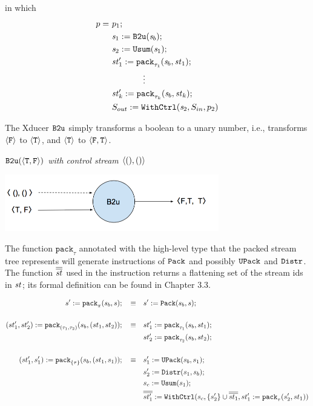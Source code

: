 in which $$ \begin{aligned}
p = & \ p_1; \\
& \ \sdef{\s_1}{\bu(\s_b)}; \\
& \ \sdef{\s_2}{\usum(\s_1)}; \\
& \ \sdef{\st_1'}{\Pack{\s_b}{\st_1}{\tau_1}}; \\
& \qquad \qquad \vdots \\
& \ \sdef{\st_k'}{\Pack{\s_b}{\st_k}{\tau_k}}; \\
& \ \withctrl{\s_2}{p_2}{\Sin}{\Sout} \\
\end{aligned}$$
	
The Xducer $\bu$ simply transforms a boolean to a unary number, i.e.,  transforms $\oF$ to $\oT$, and $\oT$ to $\< \F, \T \'>$.
\begin{example} \emph{$\bu({\<\T,\F\'>})$ with control stream $\< (),() \'>$}\\
\begin{center}
	\includegraphics[width=0.7\textwidth]{b2uxudcer2}
\end{center}
\end{example}

The function $\mathtt{pack}_{\tau}$ annotated with the high-level type  that the packed stream tree represents will generate instructions of $\pack$ and possibly $\upack$ and $\distr$. The function $\olol{st}$  used in the instruction \wc returns a flattening set of the stream ids in $\st$; its formal definition can be found in Chapter 3.3.

\begin{align*}
s' := \Pack{s_b}{s}{\pi}; \quad \equiv & \quad s' := \packf{s_b}{s}; \\
\\
(st'_1,st'_2)  := \Pack{s_b}{(st_1,st_2)}{(\tau_1,\tau_2)}; \quad \equiv & \quad st_1' := \Pack{s_b}{st_1}{\tau_1}; \\ 
&\quad st_2' := \Pack{s_b}{st_2}{\tau_2};\\
\\
(st'_1,s_1')  := \Pack{s_b}{(st_1,s_1)}{\{\tau\}}; \quad \equiv & \quad s_1' := \upackf{s_b}{s_1}; \\ 
&\quad s_2' := \distrf{s_1}{s_b};\\
&\quad s_c := \usumf{s_1}; \\
&\quad \withctrl{s_c}{st_1' :=  \Pack{s_2'}{st_1}{\tau}}{\{s_2'\} \cup \olol{st_1}}{\olol{st'_1}} \\
\end{align*}




